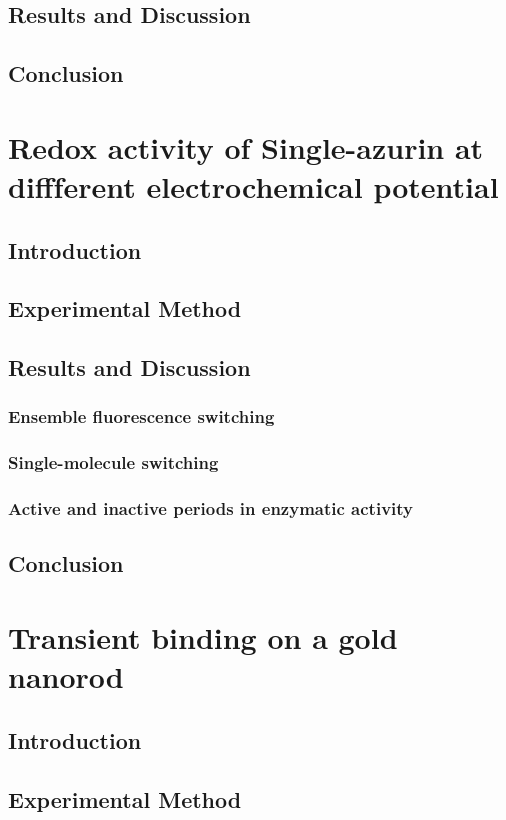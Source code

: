 \section{Results and Discussion}
\section{Conclusion}

\chapter{Redox activity of Single-azurin at diffferent electrochemical potential}
\section{Introduction}
\section{Experimental Method}
\section{Results and Discussion}
\subsection{Ensemble fluorescence switching}
\subsection{Single-molecule switching}
\subsection{Active and inactive periods in enzymatic activity}
\section{Conclusion}

\chapter{Transient binding on a gold nanorod}
\section{Introduction}
\section{Experimental Method}
